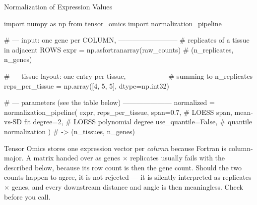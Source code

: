 \begin{recipe}[label=sub:normalization]{Normalization of Expression Values}

\begin{codefragment}[language=Python,caption={Fragments to edit: the input, the tissue layout, the parameters}]
import numpy as np
from tensor_omics import normalization_pipeline

# --- input: one gene per COLUMN, --------------------------
#     replicates of a tissue in adjacent ROWS
expr = np.asfortranarray(raw_counts)  # (n_replicates, n_genes)

# --- tissue layout: one entry per tissue, -----------------
#     summing to n_replicates
reps_per_tissue = np.array([4, 5, 5], dtype=np.int32)

# --- parameters (see the table below) ---------------------
normalized = normalization_pipeline(
    expr, reps_per_tissue,
    span=0.7,            # LOESS span, mean-vs-SD fit
    degree=2,            # LOESS polynomial degree
    use_quantile=False,  # quantile normalization
)                        # -> (n_tissues, n_genes)
\end{codefragment}

\begin{note}
  Tensor Omics stores one expression vector per \emph{column} because Fortran
  is column-major. A matrix handed over as genes $\times$ replicates usually
  fails with the  described below, because its row
  count is then the gene count. Should the two counts happen to agree, it is
  not rejected --- it is silently interpreted as replicates $\times$ genes,
  and every downstream distance and angle is then meaningless. Check
   before you call.
\end{note}


\end{recipe}
